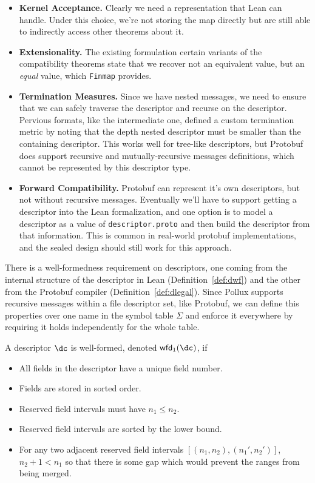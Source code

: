 \begin{itemize}
\item \textbf{Kernel Acceptance.} Clearly we need a representation that Lean can
  handle. Under this choice, we're not storing the map directly but are still
  able to indirectly access other theorems about it.
\item \textbf{Extensionality.} The existing formulation certain variants of the
  compatibility theorems state that we recover not an equivalent value, but an
  \emph{equal} value, which \texttt{Finmap} provides.
\item \textbf{Termination Measures.} Since we have nested messages, we need to
  ensure that we can safely traverse the descriptor and recurse on the
  descriptor. Pervious formats, like the intermediate one, defined a custom
  termination metric by noting that the depth nested descriptor must be smaller
  than the containing descriptor. This works well for tree-like descriptors, but
  Protobuf does support recursive and mutually-recursive messages definitions,
  which cannot be represented by this descriptor type.
\item \textbf{Forward Compatibility.} Protobuf can represent it's own
  descriptors, but not without recursive messages. Eventually we'll have to
  support getting a descriptor into the Lean formalization, and one option is to
  model a descriptor as a value of \texttt{descriptor.proto} and then build the
  descriptor from that information. This is common in real-world protobuf
  implementations, and the sealed design should still work for this approach.
\end{itemize}

There is a well-formedness requirement on descriptors, one coming from the
internal structure of the descriptor in Lean (Definition~\ref{def:dwf}) and the
other from the Protobuf compiler (Definition~\ref{def:dlegal}). Since Pollux
supports recursive messages within a file descriptor set, like Protobuf, we can
define this properties over one name in the symbol table $\Sigma$ and enforce it
everywhere by requiring it holds independently for the whole table.

\vspace{1em}
\begin{definition}\label{def:dwf}
  A descriptor $\dc$ is well-formed, denoted $\wfd{\dc}$, if
  \begin{itemize}
  \item All fields in the descriptor have a unique field number.
  \item Fields are stored in sorted order.
  \item Reserved field intervals must have $n_1 \le n_2$.
  \item Reserved field intervals are sorted by the lower bound.
  \item For any two adjacent reserved field intervals $[(n_1, n_2), (n_1',
    n_2')]$, $n_2 + 1 < n_1$ so that there is some gap which would prevent the
    ranges from being merged.
  \end{itemize}
\end{definition}

